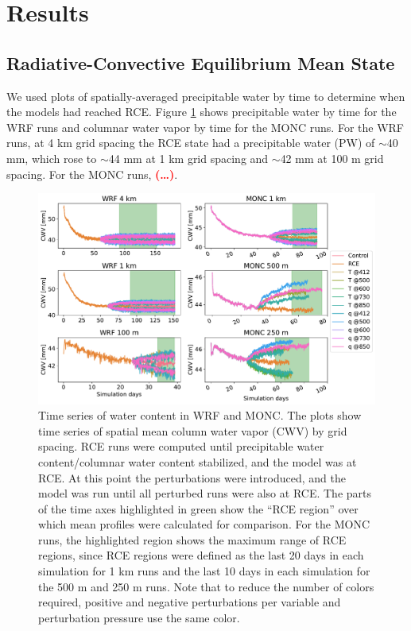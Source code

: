 \documentclass[draft]{agujournal2019}
\newcommand{\todo}[1]{\textcolor{red}{\textbf{(#1)}}}
\begin{document}
\section{Results}
\label{sec:results}

\subsection{Radiative-Convective Equilibrium Mean State}

We used plots of spatially-averaged precipitable water by time to determine when
the models had reached RCE. Figure \ref{fig:rce_pw} shows precipitable water by
time for the WRF runs and columnar water vapor by time for the MONC runs. For
the WRF runs, at 4 km grid spacing the RCE state had a precipitable water (PW)
of $\sim$40 mm, which rose to $\sim$44 mm at 1 km grid spacing and $\sim$42 mm
at 100 m grid spacing. For the MONC runs, \todo{\ldots}.

\begin{figure}[pth]
    \noindent\includegraphics[width=\textwidth]{figures/runs_timeseries.pdf}
    \caption{Time series of water content in WRF and MONC. The plots show time
    series of spatial mean column water vapor (CWV) by grid spacing. RCE runs
    were computed until precipitable water content/columnar water content
    stabilized, and the model was at RCE. At this point the perturbations were
    introduced, and the model was run until all perturbed runs were also at RCE.
    The parts of the time axes highlighted in green show the ``RCE region'' over
    which mean profiles were calculated for comparison. For the MONC runs, the
    highlighted region shows the maximum range of RCE regions, since RCE regions
    were defined as the last 20 days in each simulation for 1 km runs and the
    last 10 days in each simulation for the 500 m and 250 m runs. Note that to
    reduce the number of colors required, positive and negative perturbations
    per variable and perturbation pressure use the same color.}
    \label{fig:rce_pw}
\end{figure}
\end{document}
